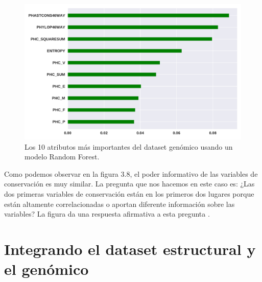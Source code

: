 \begin{figure}[H]
    \centering
    \includegraphics[scale=0.55]{documents/latex/figures/3/importance_2.pdf}
    \caption{Los 10 atributos más importantes del dataset genómico usando un modelo Random Forest. }
    \label{fig:importance_2}
\end{figure}

Como podemos observar en la figura 3.8, el poder informativo de las variables de conservación es muy similar. La pregunta que nos hacemos en este caso es: ¿Las dos primeras variables de conservación están en los primeros dos lugares porque están altamente correlacionadas o aportan diferente información sobre las variables? La figura \todo{[x]} da una respuesta afirmativa a esta pregunta . 



\section{Integrando el dataset estructural y el genómico}

